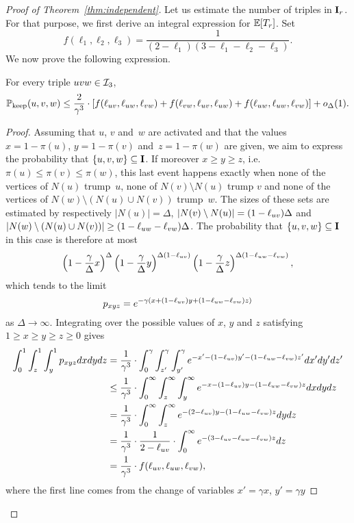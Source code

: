 \begin{proof}[Proof of Theorem~\ref{thm:independent}]
Let us estimate the number of triples in ${\bf{I}}_r$.
For that purpose, we first derive an integral expression for $\mathbb{E}[T_r]$.
Set
\[
   f(\ell_1,\ell_2,\ell_3)=
   \frac{1}{(2-\ell_1)(3-\ell_1-\ell_2-\ell_3)}.
\]
We now prove the following expression.
\begin{claim}\label{claim:pkeep triples}
For every triple $uvw\in{\mathcal{I}}_3$,
\[
   \mathbb{P}_{\text{keep}}(u,v,w)\leq
   \frac{2}{\gamma^3}\cdot
   \left[
   f(\ell_{uv},\ell_{uw},\ell_{vw})+
   f(\ell_{vw},\ell_{uv},\ell_{uw})+
   f(\ell_{uw},\ell_{uw},\ell_{vw})
   \right]+ o_\Delta(1).
   \]
\end{claim}
\begin{proof}
Assuming that $u$, $v$ and~$w$ are activated and that
the values $x=1-\pi(u)$, $y=1-\pi(v)$ and~$z=1-\pi(w)$
are given, we aim to express the probability that $\{u,v,w\}\subseteq{\bf{I}}$.
If moreover $x\ge y\ge z$, i.e.~$\pi(u)\le\pi(v)\le\pi(w)$,
this last event happens exactly when none of the  vertices of $N(u)$ trump~$u$,
none of $N(v)\setminus N(u)$ trump $v$ and
none of the vertices of $N(w)\setminus(N(u)\cup N(v))$
trump~$w$.
The sizes of these sets are estimated by respectively
$|N(u)|=\Delta$, $|N(v)\setminus N(u)|=(1-\ell_{uv})\Delta$
and $|N(w)\setminus(N(u)\cup N(v))|\geq(1-\ell_{uw}-\ell_{vw})\Delta$.
The probability that $\{u,v,w\}\subseteq{\bf{I}}$ in this case is therefore at most
 \[
        \left(1-\frac{\gamma}{\Delta}x\right)^\Delta
        \left(1-\frac{\gamma}{\Delta}y\right)^{\Delta(1-\ell_{uv})}
        \left(1-\frac{\gamma}{\Delta}z\right)^{\Delta(1-\ell_{uw}-\ell_{vw})},
 \]
 which tends to the limit
 \[
   p_{xyz}=
    e^{-\gamma\left(x +
    \left(1-\ell_{uv}\right)y
    + (1-\ell_{uw}-\ell_{vw})z
    \right)}
  \]
  as $\Delta\to\infty$.
%
Integrating over the possible values of $x$, $y$ and $z$
satisfying $1\geq x\geq y\geq z\geq 0$ gives
\begin{align*}
   \int_0^1\int_{z}^1\int_{y}^1p_{xyz}dxdydz
    &=\frac{1}{\gamma^3}\cdot
    \int_{0}^\gamma\int_{z'}^\gamma\int_{y'}^\gamma
    e^{-x'-(1-\ell_{uv})y'
    - (1-\ell_{uw}-\ell_{vw})z'}dx'dy'dz'\\
    &\leq \frac{1}{\gamma^3}\cdot
    \int_{0}^\infty\int_{z}^\infty\int_{y}^\infty
    e^{-x-(1-\ell_{uv})y
    - (1-\ell_{uw}-\ell_{vw})z}dxdydz\\
    &= \frac{1}{\gamma^3}\cdot\int_{0}^\infty\int_{z}^\infty e^{-(2-\ell_{uv})y- (1-\ell_{uw}-\ell_{vw})z}dydz \\
    &= \frac{1}{\gamma^3}\cdot\frac{1}{2-\ell_{uv}}\cdot\int_{0}^\infty e^{- (3-\ell_{uv}-\ell_{uw}-\ell_{vw})z}dz\\
    &= \frac{1}{\gamma^3}\cdot f(\ell_{uv},\ell_{uw},\ell_{vw}),
\end{align*}
where the first line comes from the change of variables $x'=\gamma x$, $y'=\gamma y$

\end{proof}
\end{proof}

